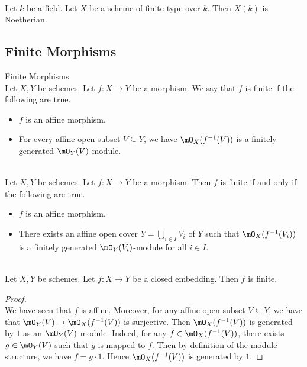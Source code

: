 \documentclass[a4paper]{article}
\begin{document}
\begin{lmm}{}{}\\
Let $k$ be a field. Let $X$ be a scheme of finite type over $k$. Then $X(k)$ is Noetherian. 
\end{lmm}

\subsection{Finite Morphisms}
\begin{defn}{Finite Morphisms}{}\\
Let $X,Y$ be schemes. Let $f:X\to Y$ be a morphism. We say that $f$ is finite if the following are true. 
\begin{itemize}
\item $f$ is an affine morphism. 
\item For every affine open subset $V\subseteq Y$, we have $\mO_X(f^{-1}(V))$ is a finitely generated $\mO_Y(V)$-module. 
\end{itemize}
\end{defn}

\begin{lmm}{}{}\\
Let $X,Y$ be schemes. Let $f:X\to Y$ be a morphism. Then $f$ is finite if and only if the following are true. 
\begin{itemize}
\item $f$ is an affine morphism. 
\item There exists an affine open cover $Y=\bigcup_{i\in I}V_i$ of $Y$ such that $\mO_X(f^{-1}(V_i))$ is a finitely generated $\mO_Y(V_i)$-module for all $i\in I$. 
\end{itemize}
\end{lmm}

\begin{lmm}{}{}\\
Let $X,Y$ be schemes. Let $f:X\to Y$ be a closed embedding. Then $f$ is finite. 
\begin{proof}\\
We have seen that $f$ is affine. Moreover, for any affine open subset $V\subseteq Y$, we have that $\mO_Y(V)\to\mO_X(f^{-1}(V))$ is surjective. Then $\mO_X(f^{-1}(V))$ is generated by $1$ as an $\mO_Y(V)$-module. Indeed, for any $f\in\mO_X(f^{-1}(V))$, there exists $g\in\mO_Y(V)$ such that $g$ is mapped to $f$. Then by definition of the module structure, we have $f=g\cdot 1$. Hence $\mO_X(f^{-1}(V))$ is generated by $1$. 
\end{proof}
\end{lmm}
\end{document}
